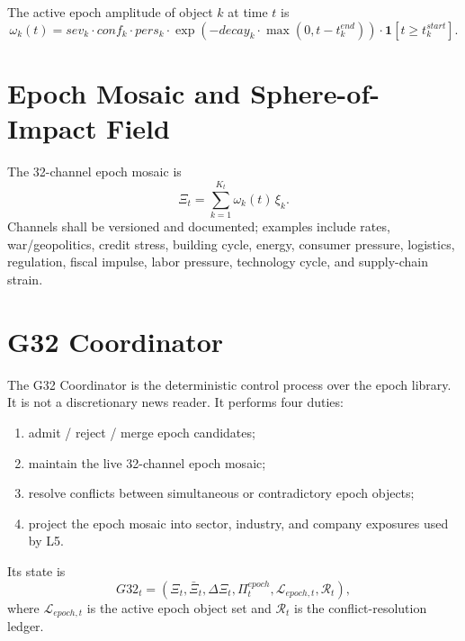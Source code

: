 The active epoch amplitude of object $k$ at time $t$ is
\[
\omega_k(t)=sev_k\cdot conf_k\cdot pers_k\cdot \exp(-decay_k\cdot \max(0,t-t_k^{end}))\cdot \mathbf{1}[t\ge t_k^{start}].
\]

\section{Epoch Mosaic and Sphere-of-Impact Field}

The 32-channel epoch mosaic is
\[
\Xi_t = \sum_{k=1}^{K_t} \omega_k(t)\,\xi_k.
\]
Channels shall be versioned and documented; examples include rates, war/geopolitics, credit stress, building cycle, energy, consumer pressure, logistics, regulation, fiscal impulse, labor pressure, technology cycle, and supply-chain strain.

\section{G32 Coordinator}

The G32 Coordinator is the deterministic control process over the epoch library. It is not a discretionary news reader. It performs four duties:
\begin{enumerate}[leftmargin=1.2cm]
    \item admit / reject / merge epoch candidates;
    \item maintain the live 32-channel epoch mosaic;
    \item resolve conflicts between simultaneous or contradictory epoch objects;
    \item project the epoch mosaic into sector, industry, and company exposures used by L5.
\end{enumerate}

Its state is
\[
G32_t=(\Xi_t,\bar\Xi_t,\Delta\Xi_t,\Pi_t^{epoch},\mathcal{L}_{epoch,t},\mathcal{R}_t),
\]
where $\mathcal{L}_{epoch,t}$ is the active epoch object set and $\mathcal{R}_t$ is the conflict-resolution ledger.

